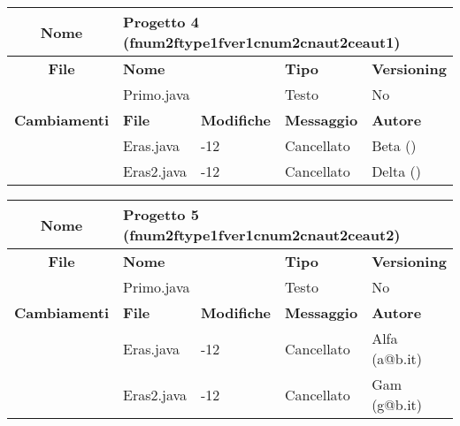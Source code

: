 \begin{table}[ht]
\footnotesize
\begin{tabular}{|c|p{2.5cm}|p{2cm}|p{2.5cm}|p{2.5cm}|}
  \hline
  \textbf{Nome}	& \multicolumn{4}{l|}{Progetto 4 (fnum2ftype1fver1cnum2cnaut2ceaut1)} 									\\
  \hline
  \rowcolor{lightgray}\textbf{File} 		& \multicolumn{2}{l|}{\textbf{Nome}}		& \textbf{Tipo}		& \textbf{Versioning} 		\\
						\cline{2-5}
						& \multicolumn{2}{l|}{Primo.java}		& Testo			& No				\\
  \hline
  \rowcolor{lightgray}\textbf{Cambiamenti}	& \textbf{File}		&\textbf{Modifiche}	& \textbf{Messaggio}	& \textbf{Autore}		\\
						\cline{2-5}
						& Eras.java		& -12	  		& Cancellato		& Beta ()			\\
						\cline{2-5}
						& Eras2.java		& -12	  		& Cancellato		& Delta ()			\\
  \hline
\end{tabular}
\end{table}

\begin{table}[ht]
\footnotesize
\begin{tabular}{|c|p{2.5cm}|p{2cm}|p{2.5cm}|p{2.5cm}|}
  \hline
  \textbf{Nome}	& \multicolumn{4}{l|}{Progetto 5 (fnum2ftype1fver1cnum2cnaut2ceaut2)} 									\\
  \hline
  \rowcolor{lightgray}\textbf{File} 		& \multicolumn{2}{l|}{\textbf{Nome}}		& \textbf{Tipo}		& \textbf{Versioning} 		\\
						\cline{2-5}
						& \multicolumn{2}{l|}{Primo.java}		& Testo			& No				\\
  \hline
  \rowcolor{lightgray}\textbf{Cambiamenti}	& \textbf{File}		&\textbf{Modifiche}	& \textbf{Messaggio}	& \textbf{Autore}		\\
						\cline{2-5}
						& Eras.java		& -12	  		& Cancellato		& Alfa (a@b.it)			\\
						\cline{2-5}
						& Eras2.java		& -12	  		& Cancellato		& Gam (g@b.it)		\\
  \hline
\end{tabular}
\end{table}



